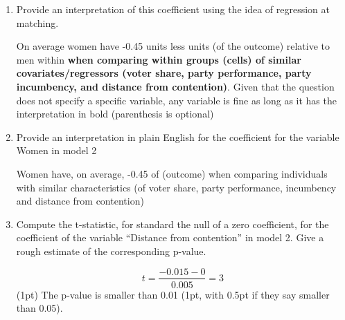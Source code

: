 \documentclass[answers]{exam}
\begin{document}
\begin{enumerate}
\begin{enumerate}[label=\alph*)]
\begin{solution}
   Full credit if the refer to the outcome in general terms (Y or outcome is fine)
   
   Estimated equation: 
   \begin{equation*}
         \centering
    \text{Outcome} = 0.281 -0.450\times \text{Women}+0.276 \times \text{Vote share lag}+0.666 \times \\\text{Party performance}+6.783 \times \text{Incumbent Party}-0.015 \times \text{Distance from contention}
    \end{equation*}
   
    \end{solution}
    \item Provide an interpretation of this coefficient using the idea of regression at matching.
     \begin{solution}
     
    On average women have -0.45 units less units (of the outcome) relative to men within \textbf{when comparing within groups (cells) of similar covariates/regressors (voter share, party performance, party incumbency, and distance from contention)}. Given that the question does not specify a specific variable, any variable is fine as long as it has the interpretation in bold (parenthesis is optional) 
    \end{solution}
    \item Provide an interpretation in plain English for the coefficient for the variable Women in model 2
     \begin{solution}
    Women have, on average, -0.45 of (outcome) when comparing individuals with similar characteristics (of voter share, party performance, incumbency and distance from contention)
    \end{solution}
    \item Compute the t-statistic, for standard the null of a zero coefficient, for the coefficient of the variable “Distance from contention” in model 2. Give a rough estimate of the corresponding p-value. 
    \begin{solution}
    $$t = \frac{-0.015-0}{0.005} =3 $$ (1pt) The p-value is smaller than 0.01 (1pt, with 0.5pt if they say smaller than 0.05).
    

    \end{solution}
  \end{enumerate}

 



\end{enumerate}
\end{document}
